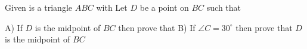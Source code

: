 Given is a triangle $ABC$ with Let $D$ be a point on $BC$ such that 

A) If $D$ is the midpoint of $BC$ then prove that 
B) If $\angle{C}=30^{\circ}$ then prove that $D$ is the midpoint of $BC$